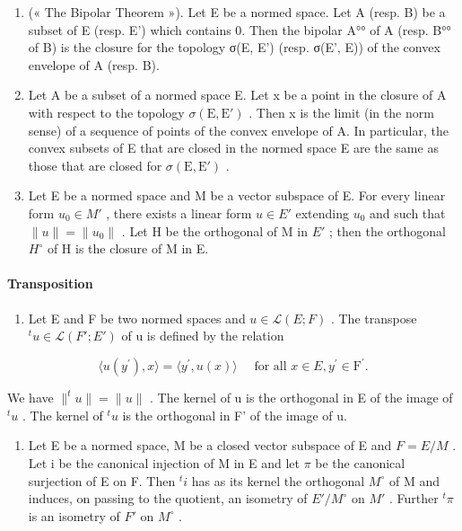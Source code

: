 \begin{enumerate}
\def\labelenumi{\arabic{enumi})}
\setcounter{enumi}{5}
\item
  (« The Bipolar Theorem »). Let E be a normed space. Let A (resp. B) be a subset of E (resp. E') which contains 0. Then the bipolar A°° of A (resp. B°° of B) is the closure for the topology σ(E, E') (resp. σ(E', E)) of the convex envelope of A (resp. B).
\item
  Let A be a subset of a normed space E. Let x be a point in the closure of A with respect to the topology \(\sigma(\mathrm{E}, \mathrm{E}')\) . Then x is the limit (in the norm sense) of a sequence of points of the convex envelope of A. In particular, the convex subsets of E that are closed in the normed space E are the same as those that are closed for \(\sigma(\mathrm{E}, \mathrm{E}')\) .
\item
   Let E be a normed space and M be a vector subspace of E. For every linear form \(u_{0} \in M'\) , there exists a linear form \(u \in E'\) extending \(u_{0}\) and such that \(\|u\| = \|u_{0}\|\) . Let H be the orthogonal of M in \(E'\) ; then the orthogonal \(H^{\circ}\) of H is the closure of M in E.
\end{enumerate}

\paragraph{Transposition}

\begin{enumerate}
\def\labelenumi{\arabic{enumi})}
\setcounter{enumi}{8}
\tightlist
\item
  Let E and F be two normed spaces and \(u \in \mathcal{L}(E; F)\) . The transpose \(^{t}u \in \mathcal{L}(F'; E')\) of u is defined by the relation
\end{enumerate}

\[
\langle u (y ^ {\prime}), x \rangle = \langle y ^ {\prime}, u (x) \rangle \quad \text {   for   all   } x \in E, y ^ {\prime} \in \mathrm{F} ^ {\prime}.\tag{6}
\]

We have \(\|^{t}u\| = \|u\|\) . The kernel of u is the orthogonal in E of the image of \(^{t}u\) . The kernel of \(^{t}u\) is the orthogonal in F' of the image of u.

\begin{enumerate}
\def\labelenumi{\arabic{enumi})}
\setcounter{enumi}{9}
\tightlist
\item
  Let E be a normed space, M be a closed vector subspace of E and \(F = E/M\) . Let i be the canonical injection of M in E and let \(\pi\) be the canonical surjection of E on F. Then \(^{t}i\) has as its kernel the orthogonal \(M^{\circ}\) of M and induces, on passing to the quotient, an isometry of \(E'/M^{\circ}\) on \(M'\) . Further \(^{t}\pi\) is an isometry of \(F'\) on \(M^{\circ}\) .
\end{enumerate}

